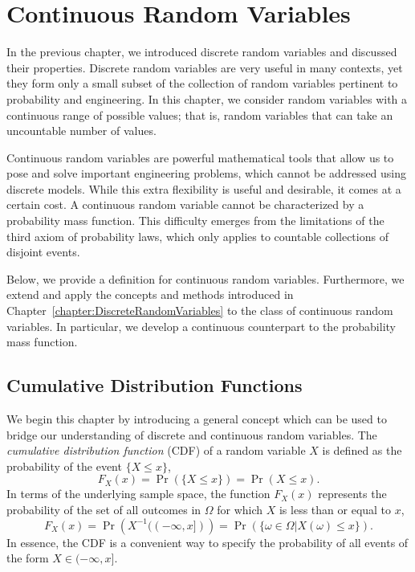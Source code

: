 \chapter{Continuous Random Variables}

In the previous chapter, we introduced discrete random variables and discussed their properties.
Discrete random variables are very useful in many contexts, yet they form only a small subset of the collection of random variables pertinent to probability and engineering.
In this chapter, we consider random variables with a continuous range of possible values; that is, random variables that can take an uncountable number of values.

Continuous random variables are powerful mathematical tools that allow us to pose and solve important engineering problems, which cannot be addressed using discrete models.
While this extra flexibility is useful and desirable, it comes at a certain cost.
A continuous random variable cannot be characterized by a probability mass function.
This difficulty emerges from the limitations of the third axiom of probability laws, which only applies to countable collections of disjoint events.

Below, we provide a definition for continuous random variables.
Furthermore, we extend and apply the concepts and methods introduced in Chapter~\ref{chapter:DiscreteRandomVariables} to the class of continuous random variables.
In particular, we develop a continuous counterpart to the probability mass function.


\section{Cumulative Distribution Functions}

We begin this chapter by introducing a general concept which can be used to bridge our understanding of discrete and continuous random variables.
The \emph{cumulative distribution function} (CDF) of a random variable $X$ is defined as the probability of the event $\{X \leq x \}$,
\begin{equation*}
F_X (x) = \Pr ( \{ X \leq x \} ) = \Pr (X \leq x).
\end{equation*}
In terms of the underlying sample space, the function $F_X (x)$ represents the probability of the set of all outcomes in $\Omega$ for which $X$ is less than or equal to $x$,
\begin{equation*}
F_X (x) = \Pr \left( X^{-1} ( (- \infty, x]) \right)
= \Pr (\{ \omega \in \Omega | X(\omega) \leq x \}).
\end{equation*}
In essence, the CDF is a convenient way to specify the probability of all events of the form $X \in (-\infty, x]$.

